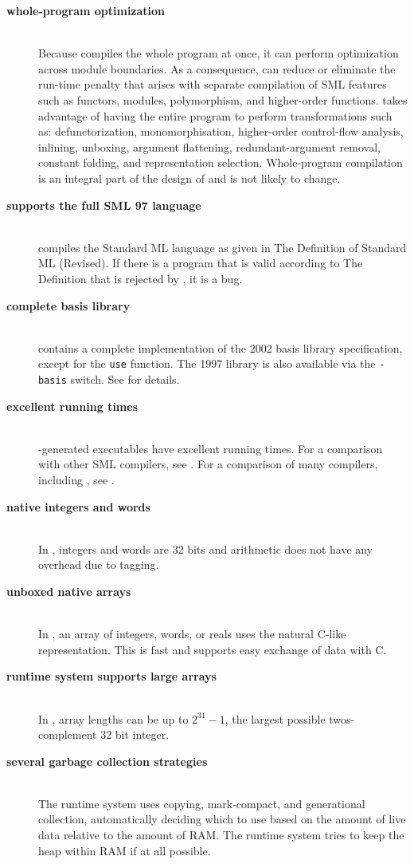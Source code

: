 
\newcommand{\feature}[1]{\item[\bf #1]\hspace{1in}\\}
\begin{description}
\feature{whole-program optimization}
Because {\mlton} compiles the whole program at once, it can perform optimization
across module boundaries.  As a consequence, {\mlton} can reduce or eliminate
the run-time penalty that arises with separate compilation of SML features such
as functors, modules, polymorphism, and higher-order functions.  {\mlton} takes
advantage of having the entire program to perform transformations such as:
defunctorization, monomorphisation, higher-order control-flow analysis,
inlining, unboxing, argument flattening, redundant-argument removal, constant
folding, and representation selection.  Whole-program compilation is an integral
part of the design of {\mlton} and is not likely to change.

\feature{supports the full SML 97 language}
{\mlton} compiles the Standard ML language as given in The Definition
of Standard ML (Revised)\cite{MTHM97}.  If there is a program that is
valid according to The Definition that is rejected by {\mlton}, it is
a bug.

\feature{complete basis library}
{\mlton} contains a complete implementation of the 2002 basis library
specification, except for the {\tt use} function.  The 1997 library is
also available via the {\tt -basis} switch.  See
 for details.

\feature{excellent running times}
{\mlton}-generated executables have excellent running times.
For a comparison with other SML compilers, see
.
For a comparison of many compilers, including {\mlton}, see
.

\feature{native integers and words}
In {\mlton}, integers and words are 32 bits and arithmetic does not have
any overhead due to tagging.

\feature{unboxed native arrays}
In {\mlton}, an array of integers, words, or reals uses the natural C-like
representation.  This is fast and supports easy exchange of data with C.

\feature{runtime system supports large arrays}
In {\mlton}, array lengths can be up to $2^{31} - 1$, the largest possible
twos-complement 32 bit integer.

\feature{several garbage collection strategies}
The {\mlton} runtime system uses copying, mark-compact, and generational
collection, automatically deciding which to use based on the amount of live
data relative to the amount of RAM.  The runtime system tries to keep the heap
within RAM if at all possible.


\end{description}
